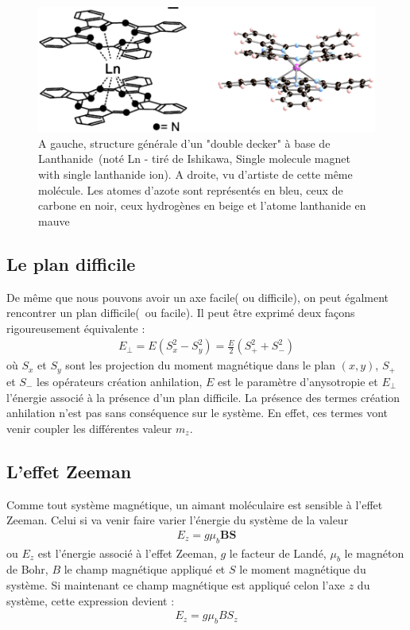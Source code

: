 \begin{figure}
\centering \includegraphics[scale=0.3]{Theorie/MagMol/figure2/figure2.png} 
\caption{A gauche, structure générale d'un "double decker" à base de Lanthanide~(noté Ln - tiré de Ishikawa, Single molecule magnet with single lanthanide ion). A droite, vu d'artiste de cette m\^eme molécule. Les atomes d'azote sont représentés en bleu, ceux de carbone en noir, ceux hydrogènes en beige et l'atome lanthanide en mauve}
\label{TbPc2}
\end{figure}

\subsection{Le plan difficile}
De m\^eme que nous pouvons avoir un axe facile( ou difficile), on peut égalment rencontrer un plan difficile(~ou facile). Il peut \^etre exprimé deux façons rigoureusement équivalente :
\begin{eqnarray}
E_{\perp} = E ( S_x^2 -S_y^2)  = \frac{E}{2} ( S_+^2  + S_-^2) \nonumber 
\end{eqnarray}
où $S_x$ et $S_y$ sont les projection du moment magnétique dans le plan $(x,y)$, $S_+$ et $S_-$ les opérateurs création anhilation, $E$ est le paramètre d'anysotropie et $E_{\perp}$ l'énergie associé à la présence d'un plan difficile. La présence des termes création anhilation n'est pas sans conséquence sur le système. En effet, ces termes vont venir coupler les différentes valeur $m_z$.

\subsection{L'effet Zeeman}
Comme tout système magnétique, un aimant moléculaire est sensible à l'effet Zeeman. Celui si va venir faire varier l'énergie du système de la valeur
\begin{eqnarray}
E_{z}= g\mu_b \mathbf{BS} \nonumber
\end{eqnarray}
ou $E_{z}$ est l'énergie associé à l'effet Zeeman, $g$ le facteur de Landé, $\mu_b$ le magnéton de Bohr, $B$ le champ magnétique appliqué et $S$ le moment magnétique du système. Si maintenant ce champ magnétique est appliqué celon l'axe $z$ du système, cette expression devient :
\begin{eqnarray}
E_{z}= g\mu_b B S_z \nonumber
\end{eqnarray}

